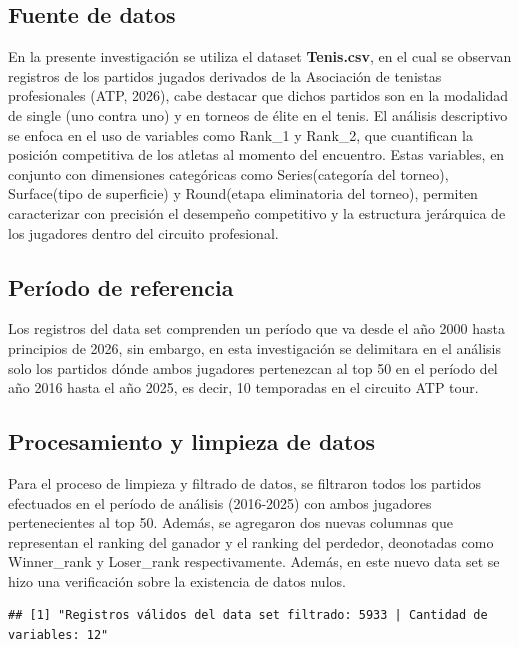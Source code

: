 \documentclass[oneside,11pt]{Latex/Classes/PhDthesisPSnPDF}
\begin{document}
\subsection{Fuente de datos}

En la presente investigación se utiliza el dataset \textbf{Tenis.csv},
en el cual se observan registros de los partidos jugados derivados de la
Asociación de tenistas profesionales (ATP, 2026), cabe destacar que
dichos partidos son en la modalidad de single (uno contra uno) y en
torneos de élite en el tenis. El análisis descriptivo se enfoca en el
uso de variables como Rank\_1 y Rank\_2, que cuantifican la posición
competitiva de los atletas al momento del encuentro. Estas variables, en
conjunto con dimensiones categóricas como Series(categoría del torneo),
Surface(tipo de superficie) y Round(etapa eliminatoria del torneo),
permiten caracterizar con precisión el desempeño competitivo y la
estructura jerárquica de los jugadores dentro del circuito
profesional.\\

\subsection{Período de referencia}

Los registros del data set comprenden un período que va desde el año
2000 hasta principios de 2026, sin embargo, en esta investigación se
delimitara en el análisis solo los partidos dónde ambos jugadores
pertenezcan al top 50 en el período del año 2016 hasta el año 2025, es
decir, 10 temporadas en el circuito ATP tour.\\

\subsection{Procesamiento y limpieza de datos}

Para el proceso de limpieza y filtrado de datos, se filtraron todos los
partidos efectuados en el período de análisis (2016-2025) con ambos
jugadores pertenecientes al top 50. Además, se agregaron dos nuevas
columnas que representan el ranking del ganador y el ranking del
perdedor, deonotadas como Winner\_rank y Loser\_rank respectivamente.
Además, en este nuevo data set se hizo una verificación sobre la
existencia de datos nulos.\\

\begin{verbatim}
## [1] "Registros válidos del data set filtrado: 5933 | Cantidad de variables: 12"
\end{verbatim}
\end{document}

